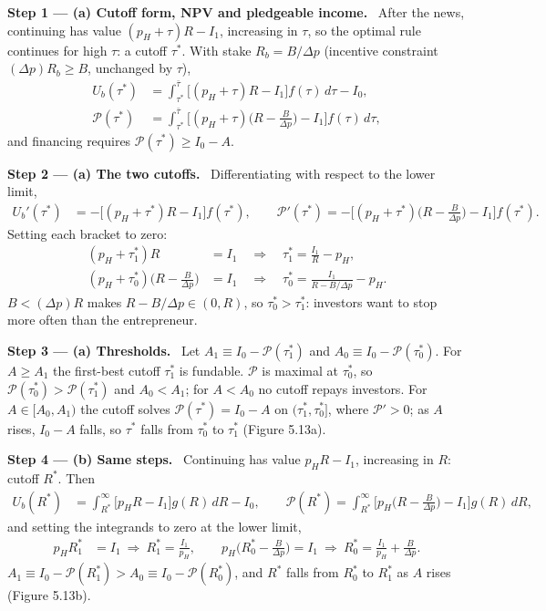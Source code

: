 \documentclass[11pt,a4paper]{article}
\newcommand{\step}[2]{\par\medskip\noindent\textbf{Step #1 --- #2.}~}
\begin{document}
\step{1}{(a) Cutoff form, NPV and pledgeable income} After the news, continuing has value $(p_H+\tau)R-I_1$, increasing in $\tau$, so the optimal rule continues for high $\tau$: a cutoff $\tau^*$. With stake $R_b=B/\Delta p$ (incentive constraint $(\Delta p)R_b\ge B$, unchanged by $\tau$),
\begin{align}
  U_b(\tau^*) &= \int_{\tau^*}^{\bar\tau}\big[(p_H+\tau)R-I_1\big]f(\tau)\,d\tau-I_0, \label{r6e15-Ua}\\
  \mathcal P(\tau^*) &= \int_{\tau^*}^{\bar\tau}\Big[(p_H+\tau)\Big(R-\frac{B}{\Delta p}\Big)-I_1\Big]f(\tau)\,d\tau, \label{r6e15-Pa}
\end{align}
and financing requires $\mathcal P(\tau^*)\ge I_0-A$.

\step{2}{(a) The two cutoffs} Differentiating with respect to the lower limit,
\begin{align}
  U_b'(\tau^*) &= -\big[(p_H+\tau^*)R-I_1\big]f(\tau^*), \qquad
  \mathcal P'(\tau^*) = -\Big[(p_H+\tau^*)\Big(R-\frac{B}{\Delta p}\Big)-I_1\Big]f(\tau^*). \nonumber
\end{align}
Setting each bracket to zero:
\begin{align}
  (p_H+\tau_1^*)R &= I_1 \quad\Longrightarrow\quad \tau_1^*=\frac{I_1}{R}-p_H, \label{r6e15-t1}\\
  (p_H+\tau_0^*)\Big(R-\frac{B}{\Delta p}\Big) &= I_1 \quad\Longrightarrow\quad \tau_0^*=\frac{I_1}{R-B/\Delta p}-p_H. \label{r6e15-t0}
\end{align}
$B<(\Delta p)R$ makes $R-B/\Delta p\in(0,R)$, so $\tau_0^*>\tau_1^*$: investors want to stop more often than the entrepreneur.

\step{3}{(a) Thresholds} Let $A_1\equiv I_0-\mathcal P(\tau_1^*)$ and $A_0\equiv I_0-\mathcal P(\tau_0^*)$. For $A\ge A_1$ the first-best cutoff $\tau_1^*$ is fundable. $\mathcal P$ is maximal at $\tau_0^*$, so $\mathcal P(\tau_0^*)>\mathcal P(\tau_1^*)$ and $A_0<A_1$; for $A<A_0$ no cutoff repays investors. For $A\in[A_0,A_1)$ the cutoff solves $\mathcal P(\tau^*)=I_0-A$ on $(\tau_1^*,\tau_0^*]$, where $\mathcal P'>0$; as $A$ rises, $I_0-A$ falls, so $\tau^*$ falls from $\tau_0^*$ to $\tau_1^*$ (Figure 5.13a).

\step{4}{(b) Same steps} Continuing has value $p_HR-I_1$, increasing in $R$: cutoff $R^*$. Then
\begin{align}
  U_b(R^*) &= \int_{R^*}^{\infty}\big[p_HR-I_1\big]g(R)\,dR-I_0,\qquad
  \mathcal P(R^*) = \int_{R^*}^{\infty}\Big[p_H\Big(R-\frac{B}{\Delta p}\Big)-I_1\Big]g(R)\,dR, \label{r6e15-b}
\end{align}
and setting the integrands to zero at the lower limit,
\begin{align}
  p_HR_1^* &= I_1 \ \Longrightarrow\ R_1^*=\frac{I_1}{p_H}, \qquad
  p_H\Big(R_0^*-\frac{B}{\Delta p}\Big) = I_1 \ \Longrightarrow\ R_0^*=\frac{I_1}{p_H}+\frac{B}{\Delta p}. \label{r6e15-R}
\end{align}
$A_1\equiv I_0-\mathcal P(R_1^*)>A_0\equiv I_0-\mathcal P(R_0^*)$, and $R^*$ falls from $R_0^*$ to $R_1^*$ as $A$ rises (Figure 5.13b).
\end{document}
